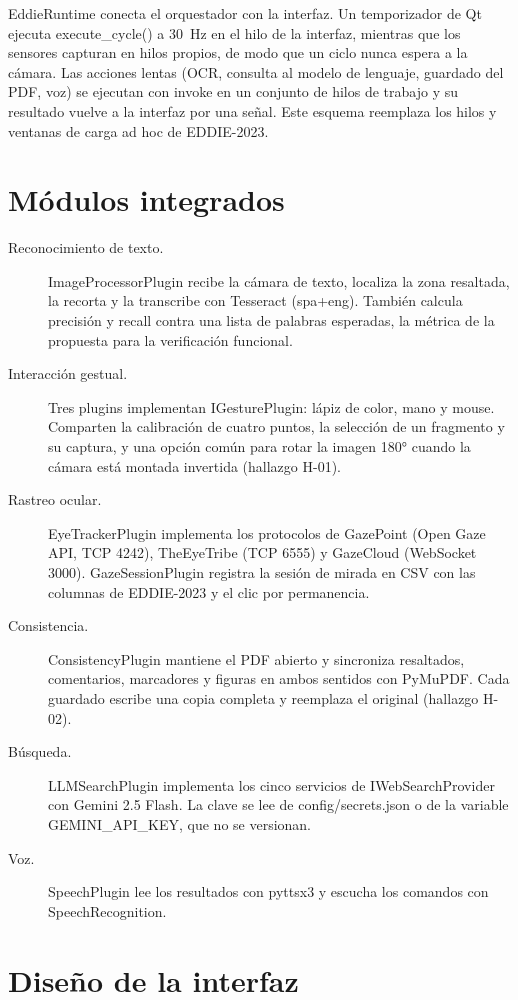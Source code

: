 EddieRuntime conecta el orquestador con la interfaz. Un temporizador de Qt ejecuta execute\_cycle() a 30~Hz en el hilo de la interfaz, mientras que los sensores capturan en hilos propios, de modo que un ciclo nunca espera a la cámara. Las acciones lentas (OCR, consulta al modelo de lenguaje, guardado del PDF, voz) se ejecutan con invoke en un conjunto de hilos de trabajo y su resultado vuelve a la interfaz por una señal. Este esquema reemplaza los hilos y ventanas de carga ad hoc de EDDIE-2023.

\section{Módulos integrados}

\begin{description}
  \item[Reconocimiento de texto.] ImageProcessorPlugin recibe la cámara de texto, localiza la zona resaltada, la recorta y la transcribe con Tesseract (spa+eng). También calcula precisión y recall contra una lista de palabras esperadas, la métrica de la propuesta para la verificación funcional.
  \item[Interacción gestual.] Tres plugins implementan IGesturePlugin: lápiz de color, mano y mouse. Comparten la calibración de cuatro puntos, la selección de un fragmento y su captura, y una opción común para rotar la imagen 180° cuando la cámara está montada invertida (hallazgo H-01).
  \item[Rastreo ocular.] EyeTrackerPlugin implementa los protocolos de GazePoint (Open Gaze API, TCP 4242), TheEyeTribe (TCP 6555) y GazeCloud (WebSocket 3000). GazeSessionPlugin registra la sesión de mirada en CSV con las columnas de EDDIE-2023 y el clic por permanencia.
  \item[Consistencia.] ConsistencyPlugin mantiene el PDF abierto y sincroniza resaltados, comentarios, marcadores y figuras en ambos sentidos con PyMuPDF. Cada guardado escribe una copia completa y reemplaza el original (hallazgo H-02).
  \item[Búsqueda.] LLMSearchPlugin implementa los cinco servicios de IWebSearchProvider con Gemini 2.5 Flash. La clave se lee de config/secrets.json o de la variable GEMINI\_API\_KEY, que no se versionan.
  \item[Voz.] SpeechPlugin lee los resultados con pyttsx3 y escucha los comandos con SpeechRecognition.
\end{description}

\section{Diseño de la interfaz}

